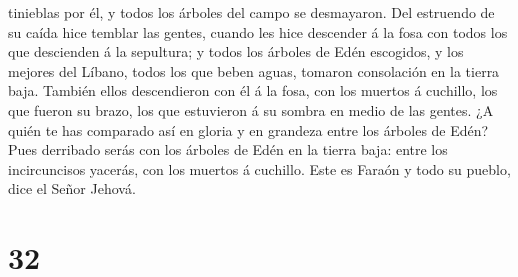 tinieblas por él, y todos los árboles del campo se desmayaron.
 Del estruendo de su caída hice temblar las gentes,
cuando les hice descender á la fosa con todos los que descienden á la
sepultura; y todos los árboles de Edén escogidos, y los mejores del
Líbano, todos los que beben aguas, tomaron consolación en la tierra
baja.  También ellos descendieron con él á la fosa, con
los muertos á cuchillo, los que fueron su brazo, los que estuvieron á su
sombra en medio de las gentes.  ¿A quién te has comparado
así en gloria y en grandeza entre los árboles de Edén? Pues derribado
serás con los árboles de Edén en la tierra baja: entre los incircuncisos
yacerás, con los muertos á cuchillo. Este es Faraón y todo su pueblo,
dice el Señor Jehová.

\hypertarget{section-31}{%
\section{32}\label{section-31}}

